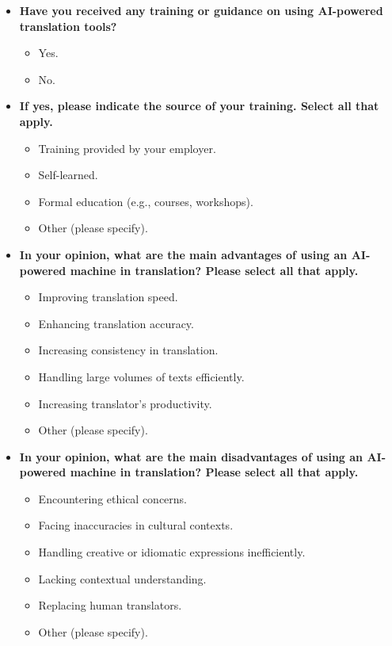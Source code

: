 \documentclass[english]{textolivre}
\begin{document}
\begin{itemize}
\item \textbf{Have you received any training or guidance on using AI-powered translation tools?}
\begin{itemize}
    \item Yes.
    \item No.
\end{itemize}

\item \textbf{If yes, please indicate the source of your training. Select all that apply.}
\begin{itemize}
    \item Training provided by your employer.
    \item Self-learned.
    \item Formal education (e.g., courses, workshops).
    \item Other (please specify).
\end{itemize}

\item \textbf{In your opinion, what are the main advantages of using an AI-powered machine in translation? Please select all that apply.}
\begin{itemize}
    \item Improving translation speed.
    \item Enhancing translation accuracy.
    \item Increasing consistency in translation.
    \item Handling large volumes of texts efficiently.
    \item Increasing translator's productivity.
    \item Other (please specify).
\end{itemize}

\item \textbf{In your opinion, what are the main disadvantages of using an AI-powered machine in translation? Please select all that apply.}
\begin{itemize}
    \item Encountering ethical concerns.
    \item Facing inaccuracies in cultural contexts.
    \item Handling creative or idiomatic expressions inefficiently.
    \item Lacking contextual understanding.
    \item Replacing human translators.
    \item Other (please specify).
\end{itemize}

\end{itemize}
\end{document}
